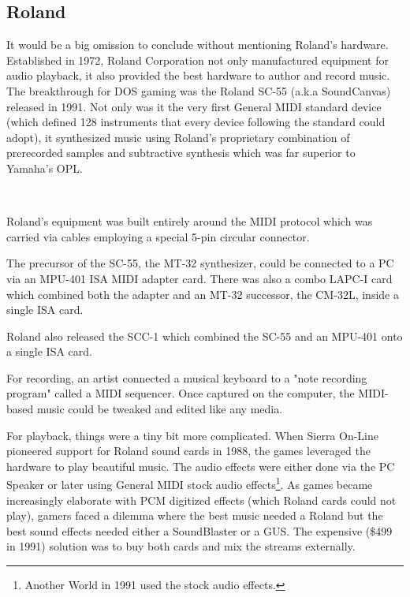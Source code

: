  \subsection{Roland}
It would be a big omission to conclude without mentioning Roland's hardware. Established in 1972, Roland Corporation not only manufactured equipment for audio playback, it also provided the best hardware to author and record music. The breakthrough for DOS gaming was the Roland SC-55 (a.k.a SoundCanvas) released in 1991. Not only was it the very first General MIDI standard device (which defined 128 instruments that every device following the standard could adopt), it synthesized music using Roland's proprietary combination of prerecorded samples and subtractive synthesis which was far superior to Yamaha's OPL.\\
 \par
 \\
 \par

Roland's equipment was built entirely around the MIDI protocol which was carried via cables employing a special 5-pin circular connector.\\
\par
 The precursor of the SC-55, the MT-32 synthesizer, could be connected to a PC via an MPU-401 ISA MIDI adapter card. There was also a combo LAPC-I card which combined both the adapter and an MT-32 successor, the CM-32L, inside a single ISA card.\\
\par 
{}
\par
Roland also released the SCC-1 which combined the SC-55 and an MPU-401 onto a single ISA card.\\
\par 
{}
\par
\pagebreak
For recording, an artist connected a musical keyboard to a "note recording program" called a MIDI sequencer. Once captured on the computer, the MIDI-based music could be tweaked and edited like any media.\\

\par
For playback, things were a tiny bit more complicated. When Sierra On-Line pioneered support for Roland sound cards in 1988, the games leveraged the hardware to play beautiful music. The audio effects were either done via the PC Speaker or later using General MIDI stock audio effects\footnote{Another World in 1991 used the stock audio effects.}. As games became increasingly elaborate with PCM digitized effects (which Roland cards could not play), gamers faced a dilemma where the best music needed a Roland but the best sound effects needed either a SoundBlaster or a GUS. The expensive (\$499 in 1991) solution was to buy both cards and mix the streams externally.\\
\par
{}

